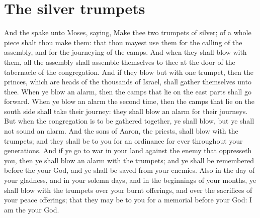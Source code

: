 \section*{The silver trumpets}
\begin{biblechapter} %
\verse And the \LORD spake unto Moses, saying,
\verse Make thee two trumpets of silver; of a whole piece shalt thou make them: that thou mayest use them for the calling of the assembly, and for the journeying of the camps.
\verse And when they shall blow with them, all the assembly shall assemble themselves to thee at the door of the tabernacle of the congregation.
\verse And if they blow but with one trumpet, then the princes, which are heads of the thousands of Israel, shall gather themselves unto thee.
\verse When ye blow an alarm, then the camps that lie on the east parts shall go forward.
\verse When ye blow an alarm the second time, then the camps that lie on the south side shall take their journey: they shall blow an alarm for their journeys.
\verse But when the congregation is to be gathered together, ye shall blow, but ye shall not sound an alarm.
\verse And the sons of Aaron, the priests, shall blow with the trumpets; and they shall be to you for an ordinance for ever throughout your generations.
\verse And if ye go to war in your land against the enemy that oppresseth you, then ye shall blow an alarm with the trumpets; and ye shall be remembered before the \LORD your God, and ye shall be saved from your enemies.
\verse Also in the day of your gladness, and in your solemn days, and in the beginnings of your months, ye shall blow with the trumpets over your burnt offerings, and over the sacrifices of your peace offerings; that they may be to you for a memorial before your God: I am the \LORD your God.

\end{biblechapter}
